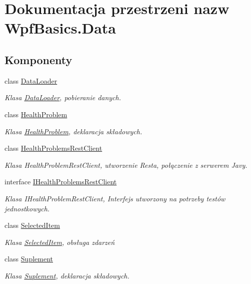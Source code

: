 \hypertarget{namespace_wpf_basics_1_1_data}{}\section{Dokumentacja przestrzeni nazw Wpf\+Basics.\+Data}
\label{namespace_wpf_basics_1_1_data}
\subsection*{Komponenty}
\begin{DoxyCompactItemize}
\item 
class \hyperlink{class_wpf_basics_1_1_data_1_1_data_loader}{Data\+Loader}
\begin{DoxyCompactList}\small\item\em Klasa \hyperlink{class_wpf_basics_1_1_data_1_1_data_loader}{Data\+Loader}, pobieranie danych. \end{DoxyCompactList}\item 
class \hyperlink{class_wpf_basics_1_1_data_1_1_health_problem}{Health\+Problem}
\begin{DoxyCompactList}\small\item\em Klasa \hyperlink{class_wpf_basics_1_1_data_1_1_health_problem}{Health\+Problem}, deklaracja składowych. \end{DoxyCompactList}\item 
class \hyperlink{class_wpf_basics_1_1_data_1_1_health_problems_rest_client}{Health\+Problems\+Rest\+Client}
\begin{DoxyCompactList}\small\item\em Klasa Health\+Problem\+Rest\+Client, utworzenie Resta, połączenie z serwerem Javy. \end{DoxyCompactList}\item 
interface \hyperlink{interface_wpf_basics_1_1_data_1_1_i_health_problems_rest_client}{I\+Health\+Problems\+Rest\+Client}
\begin{DoxyCompactList}\small\item\em Klasa I\+Health\+Problem\+Rest\+Client, Interfejs utworzony na potrzeby testów jednostkowych. \end{DoxyCompactList}\item 
class \hyperlink{class_wpf_basics_1_1_data_1_1_selected_item}{Selected\+Item}
\begin{DoxyCompactList}\small\item\em Klasa \hyperlink{class_wpf_basics_1_1_data_1_1_selected_item}{Selected\+Item}, obsługa zdarzeń \end{DoxyCompactList}\item 
class \hyperlink{class_wpf_basics_1_1_data_1_1_suplement}{Suplement}
\begin{DoxyCompactList}\small\item\em Klasa \hyperlink{class_wpf_basics_1_1_data_1_1_suplement}{Suplement}, deklaracja składowych. \end{DoxyCompactList}\end{DoxyCompactItemize}
